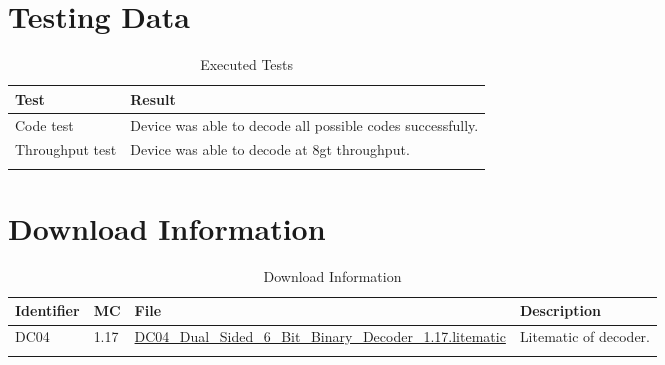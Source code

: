 \documentclass[10pt]{datasheet}
\begin{document}
\section{Testing Data}
\begin{table}[h]
\caption{Executed Tests}
\begin{tabularx}{\textwidth}{l | X}
    \thickhline
    \textbf{Test} & \textbf{Result} \\
    \hline
    Code test & Device was able to decode all possible codes successfully.\\
    \hline
    Throughput test & Device was able to decode at 8gt throughput.\\
    \thickhline
\end{tabularx}
\end{table}

\section{Download Information}
\begin{table}[h]
    \caption{Download Information}
    \begin{tabularx}{\textwidth}{l | l | l | X}
        \thickhline
        \textbf{Identifier} & \textbf{MC} & \textbf{File} & \textbf{Description} \\
        \hline
        DC04 & 1.17 & \href{https://github.com/Soontech-Annals/Archive/blob/8413f90a054b6c415703bae02badeba7541344f6/Archive/decoders/DC04\%20Dual\%20Sided\%206\%20Bit\%20Binary\%20Decoder/DC04\_Dual\_Sided\_6\_Bit\_Binary\_Decoder\_1.17.litematic?raw=1}{DC04\_Dual\_Sided\_6\_Bit\_Binary\_Decoder\_1.17.litematic} & Litematic of decoder. \\
        \hline
        \thickhline
    \end{tabularx}
\end{table}
\end{document}
